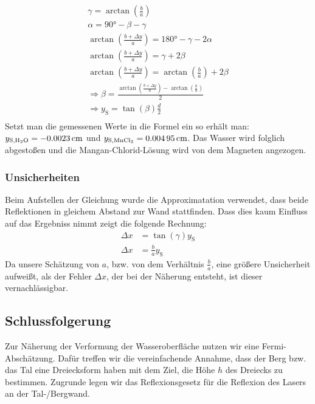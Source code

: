 \documentclass[
	a4paper,
	12pt,
	pagesize,
	ngerman
]{scrartcl}
\begin{document}
	\begin{gather*}
		\gamma = \arctan \left(\frac{b}{a}\right) \\
		\alpha = \ang{90} - \beta - \gamma \\
		\arctan \left(\frac{b+\Delta y}{a}\right) = \ang{180} - \gamma - 2\alpha \\
		\arctan \left(\frac{b+\Delta y}{a}\right) = \gamma + 2 \beta \\
		\arctan \left(\frac{b+\Delta y}{a}\right) =   \arctan \left(\frac{b}{a}\right) + 2 \beta \\
		\Rightarrow \beta = \frac{\arctan \left(\frac{b+\Delta y}{a}\right) -  \arctan \left(\frac{b}{a}\right)}{2} \\
		\Rightarrow y_\text{S} = \tan (\beta) \frac{d}{2}  \\
	\end{gather*}
	Setzt man die gemessenen Werte in die Formel ein so erhält man: $ y_{\text{S,\ce{H2O}}} = \SI{-0,0023}{ cm} $ und $y_{\text{S,\ce{MnCl2}}} = \SI{0,00495}{ cm} $. Das Wasser wird folglich abgestoßen und die Mangan-Chlorid-Lösung wird von dem Magneten angezogen.
	\subsubsection*{Unsicherheiten}
	Beim Aufstellen der Gleichung wurde die Approximatation verwendet, dass beide Reflektionen in gleichem Abstand zur Wand stattfinden. Dass dies kaum Einfluss auf das Ergebniss nimmt zeigt die folgende Rechnung:
	\begin{align*}
		\Delta x &= \tan (\gamma) y_\text{S} \\
		\Delta x &= \frac{b}{a} y_\text{S}
	\end{align*}
	Da unsere Schätzung von $a$, bzw. von dem Verhältnis $\frac{b}{a}$, eine größere Unsicherheit aufweißt, als der Fehler $\Delta x$, der bei der Näherung entsteht, ist dieser vernachlässigbar.



	\subsection{Schlussfolgerung}
	Zur Näherung der Verformung der Wasseroberfläche nutzen wir eine Fermi-Abschätzung. Dafür treffen wir die vereinfachende Annahme, dass der Berg bzw. das Tal eine Dreiecksform haben mit dem Ziel, die Höhe $h$ des Dreiecks zu bestimmen. Zugrunde legen wir das Reflexionsgesetz für die Reflexion des Lasers an der Tal-/Bergwand.
	
\end{document}
